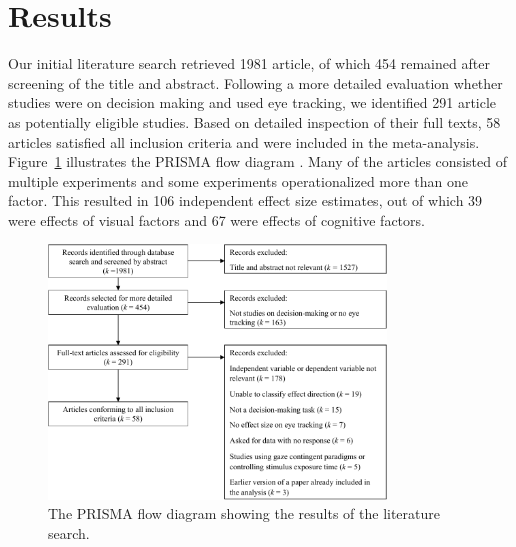 \documentclass[english,natbib,man,floatsintext]{apa6}
\begin{document}

\section{Results}

Our initial literature search retrieved 1981 article, of which 454 remained after screening of the title and abstract. Following a more detailed evaluation whether studies were on decision making and used eye tracking, we identified 291 article as potentially eligible studies. Based on detailed inspection of their full texts, 58 articles satisfied all inclusion criteria and were included in the meta-analysis. Figure~\ref{fig:flow_diagram} illustrates the PRISMA flow diagram \citep{moher2009preferred}. Many of the articles consisted of multiple experiments and some experiments operationalized more than one factor. This resulted in 106 independent effect size estimates, out of which 39 were effects of visual factors and 67 were effects of cognitive factors.


\begin{figure}[H]
\includegraphics[width=0.8\textwidth]{prisma}
\centering
\caption{The PRISMA flow diagram showing the results of the literature search.}
\label{fig:flow_diagram}
\end{figure}
\end{document}
